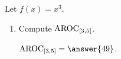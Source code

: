 \documentclass{ximera}
\author{Kenneth Berglund}
\begin{document}
\licenseSZ
\begin{exercise}

Let $f(x) = x^3$.

\begin{enumerate}
\item Compute $\mathrm{AROC}_{[3, 5]}$.

$\av_{[3, 5]} = \answer{49}$.  
	
\end{enumerate}

\end{exercise}
\end{document}
